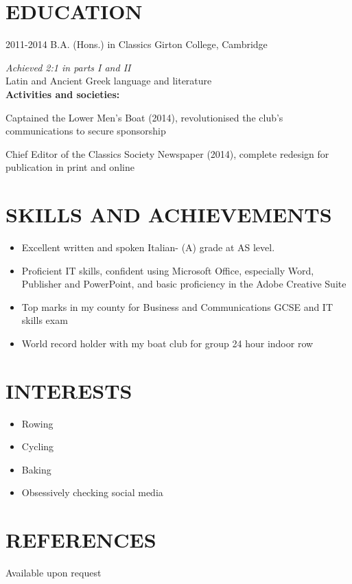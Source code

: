 \documentclass[]{friggeri-cv}
\begin{document}
\section{EDUCATION}

\begin{entrylist}
	\entry
	{2011-2014}
	{B.A. (Hons.) in Classics}
	{Girton College, Cambridge}
	{\emph{Achieved 2:1 in parts I and II}
	\\
	
	Latin and Ancient Greek language and literature
	\\
	
	\textbf{Activities and societies:} 
	
	Captained the Lower Men's Boat (2014), revolutionised the club's communications to secure sponsorship
	
	Chief Editor of the Classics Society Newspaper (2014), complete redesign for publication in print and online
	}
\end{entrylist}

\section{SKILLS AND ACHIEVEMENTS}

\begin{itemize}
	\item Excellent written and spoken Italian- (A) grade at AS level. 
	\item Proficient IT skills, confident using Microsoft Office, especially Word, Publisher and PowerPoint, and basic proficiency in the Adobe Creative Suite
	\item Top marks in my county for Business and Communications GCSE and IT skills exam 
	\item World record holder with my boat club for group 24 hour indoor row
\end{itemize}

\section{INTERESTS}

\begin{itemize}
	\item Rowing
	\item Cycling

	\item Baking
	\item Obsessively checking social media
\end{itemize}

\section{REFERENCES}

Available upon request
\end{document}
